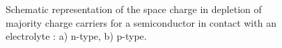 \begin{figure}[H]
\centering

\caption{Schematic representation of the space charge in depletion of majority charge carriers for 
a semiconductor in contact with an electrolyte \citep{memming2008,bard2002}:
 a) n-type, b) p-type.}
\label{fig_space_charge_depletion}
\end{figure}
